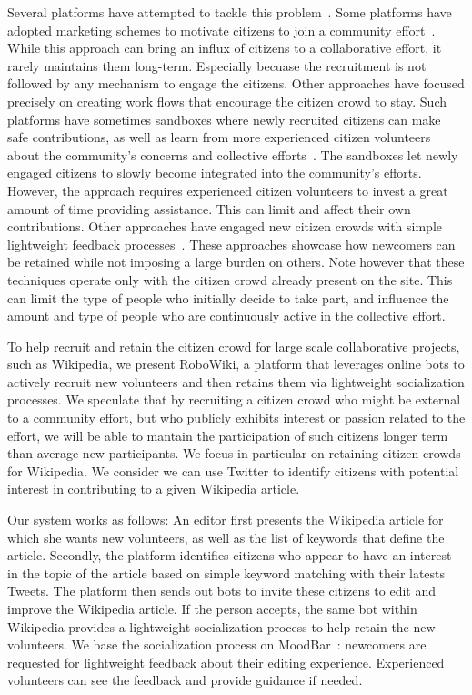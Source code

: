 \documentclass{sigchi}
\begin{document}
Several platforms have attempted to tackle this problem~\cite{ciampaglia2015moodbar,halfaker2013making,morgan2013tea}. Some platforms have adopted  marketing schemes to motivate citizens to join a community effort~\cite{saiphBotivist}. While this approach can bring an influx of citizens to a collaborative effort, it rarely maintains them long-term. Especially becuase the recruitment is not followed by any mechanism to engage the citizens. Other approaches have focused precisely on creating work flows that encourage the citizen crowd to stay.  Such platforms have sometimes sandboxes where newly recruited citizens can make safe contributions, as well as learn from more experienced citizen volunteers about the community's concerns and collective efforts~\cite{morgan2013tea}. The sandboxes let newly engaged citizens to slowly become integrated into the community's efforts. However, the approach requires experienced citizen volunteers to invest a great amount of time providing assistance. This can limit and affect their own contributions.  Other approaches have engaged new citizen crowds with simple lightweight feedback processes~\cite{ciampaglia2015moodbar}. These approaches showcase how newcomers can be retained while not imposing a large burden on others. Note however that these techniques operate only with the citizen crowd already present on the site. This can limit the type of people who initially decide to take part, and influence the amount and type of people who are continuously active in the collective effort. 

To help recruit and retain the citizen crowd for large scale collaborative projects, such as Wikipedia, we present RoboWiki, a platform that leverages online bots to actively recruit  new volunteers and then retains them via lightweight socialization processes. We speculate that by recruiting a citizen crowd who might be external to a community effort, but who publicly exhibits interest or passion related to the effort, we will be able to mantain the participation of such citizens longer term than average new participants. We focus in particular on retaining citizen crowds for Wikipedia. We consider we can use Twitter to identify citizens with potential interest in contributing to a given Wikipedia article. 
 
Our system works as follows: An editor first presents the Wikipedia article for which she wants new volunteers, as well as the list of keywords that define the article. Secondly, the platform identifies citizens who appear to have an interest in the topic of the article based on simple keyword matching with their latests Tweets. The platform then sends out bots to invite these citizens to edit and improve the Wikipedia article. If the person accepts, the same bot within Wikipedia provides a lightweight socialization process to help retain the new volunteers. We base the socialization process on MoodBar~\cite{ciampaglia2015moodbar}: newcomers  are requested for lightweight feedback about their editing experience. Experienced volunteers can see the feedback and provide guidance if needed. 
\end{document}

